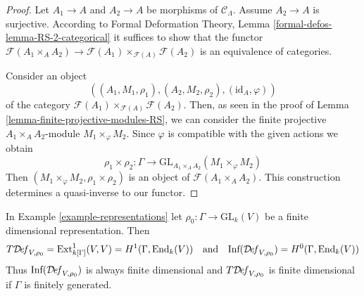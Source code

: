 \begin{proof}
Let $A_1 \to A$ and $A_2 \to A$ be morphisms of $\mathcal{C}_\Lambda$.
Assume $A_2 \to A$ is surjective. According to
Formal Deformation Theory, Lemma
\ref{formal-defos-lemma-RS-2-categorical}
it suffices to show that the functor
$\mathcal{F}(A_1 \times_A A_2) \to
\mathcal{F}(A_1) \times_{\mathcal{F}(A)} \mathcal{F}(A_2)$
is an equivalence of categories.

\medskip\noindent
Consider an object
$$
((A_1, M_1, \rho_1), (A_2, M_2, \rho_2), (\text{id}_A, \varphi))
$$
of the category $\mathcal{F}(A_1) \times_{\mathcal{F}(A)} \mathcal{F}(A_2)$.
Then, as seen in the proof of Lemma \ref{lemma-finite-projective-modules-RS},
we can consider the finite projective
$A_1 \times_A A_2$-module $M_1 \times_\varphi M_2$.
Since $\varphi$ is compatible with the given actions we obtain
$$
\rho_1 \times \rho_2 : \Gamma \longrightarrow
\text{GL}_{A_1 \times_A A_2}(M_1 \times_\varphi M_2)
$$
Then $(M_1 \times_\varphi M_2, \rho_1 \times \rho_2)$
is an object of $\mathcal{F}(A_1 \times_A A_2)$.
This construction determines a quasi-inverse to our functor.
\end{proof}

\begin{lemma}
\label{lemma-representations-TI}
In Example \ref{example-representations} let 
$\rho_0 : \Gamma \to \text{GL}_k(V)$
be a finite dimensional representation. Then
$$
T\mathcal{D}\!\mathit{ef}_{V, \rho_0} = \mathop{\mathrm{Ext}}\nolimits^1_{k[\Gamma]}(V, V) =
H^1(\Gamma, \text{End}_k(V))
\quad\text{and}\quad
\text{Inf}(\mathcal{D}\!\mathit{ef}_{V, \rho_0}) = H^0(\Gamma, \text{End}_k(V))
$$
Thus $\text{Inf}(\mathcal{D}\!\mathit{ef}_{V, \rho_0})$
is always finite dimensional
and $T\mathcal{D}\!\mathit{ef}_{V, \rho_0}$ is finite dimensional
if $\Gamma$ is finitely generated.
\end{lemma}

